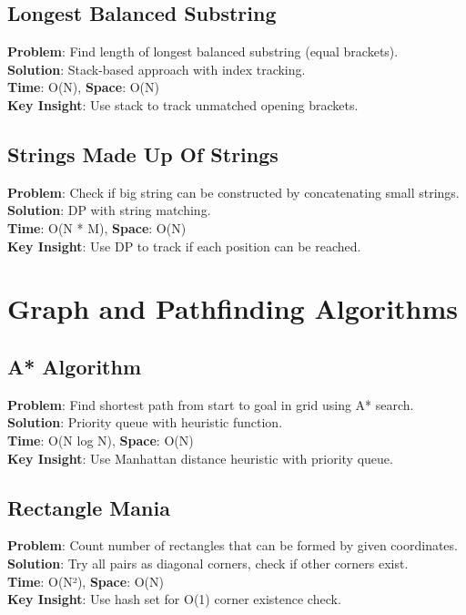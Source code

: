\documentclass{report}
\begin{document}
\subsection{Longest Balanced Substring}
\textbf{Problem}: Find length of longest balanced substring (equal brackets).\\
\textbf{Solution}: Stack-based approach with index tracking.\\
\textbf{Time}: O(N), \textbf{Space}: O(N)\\
\textbf{Key Insight}: Use stack to track unmatched opening brackets.

\subsection{Strings Made Up Of Strings}
\textbf{Problem}: Check if big string can be constructed by concatenating small strings.\\
\textbf{Solution}: DP with string matching.\\
\textbf{Time}: O(N * M), \textbf{Space}: O(N)\\
\textbf{Key Insight}: Use DP to track if each position can be reached.

\section{Graph and Pathfinding Algorithms}

\subsection{A* Algorithm}
\textbf{Problem}: Find shortest path from start to goal in grid using A* search.\\
\textbf{Solution}: Priority queue with heuristic function.\\
\textbf{Time}: O(N log N), \textbf{Space}: O(N)\\
\textbf{Key Insight}: Use Manhattan distance heuristic with priority queue.

\subsection{Rectangle Mania}
\textbf{Problem}: Count number of rectangles that can be formed by given coordinates.\\
\textbf{Solution}: Try all pairs as diagonal corners, check if other corners exist.\\
\textbf{Time}: O(N²), \textbf{Space}: O(N)\\
\textbf{Key Insight}: Use hash set for O(1) corner existence check.
\end{document}
